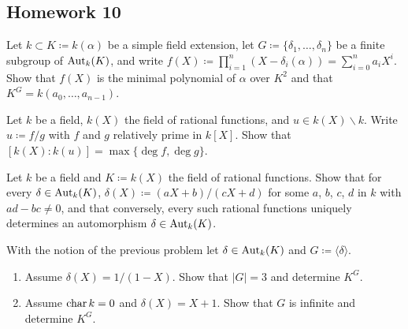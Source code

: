 \subsection{Homework 10}
\begin{problem}
  Let $k\subset K\coloneq k(\alpha)$ be a simple field extension, let
  $G\coloneq\{\delta_1,\dotsc,\delta_n\}$ be a finite subgroup of
  $\operatorname{Aut}_k(K)$, and write
  $f(X)\coloneq\prod_{i=1}^n(X-\delta_i(\alpha))=\sum_{i=0}^na_iX^i$. Show
  that $f(X)$ is the minimal polynomial of $\alpha$ over $K^2$ and that
  $K^G=k(a_0,\dotsc,a_{n-1})$.
\end{problem}
\begin{solution}
\end{solution}

\begin{problem}
  Let $k$ be a field, $k(X)$ the field of rational functions, and
  $u\in k(X)\smallsetminus k$. Write $u\coloneq f/g$ with $f$ and $g$
  relatively prime in $k[X]$. Show that
  $[k(X):k(u)]=\max\{\deg f,\deg g\}$.
\end{problem}
\begin{solution}
\end{solution}

\begin{problem}
  Let $k$ be a field and $K\coloneq k(X)$ the field of rational
  functions. Show that for every $\delta\in\operatorname{Aut}_k(K)$,
  $\delta(X)\coloneq (aX+b)/(cX+d)$ for some $a$, $b$, $c$, $d$ in $k$ with
  $ad-bc\neq 0$, and that conversely, every such rational functions
  uniquely determines an automorphism $\delta\in\operatorname{Aut}_k(K)$.
\end{problem}
\begin{solution}
\end{solution}

\begin{problem}
With the notion of the previous problem let $\delta\in\operatorname{Aut}_k(K)$ and
$G\coloneq\langle \delta \rangle$.
\begin{enumerate}[label=(\alph*),noitemsep]
\item Assume $\delta(X)=1/(1-X)$. Show that $|G|=3$ and determine $K^G$.
\item Assume $\operatorname{char} k=0$ and $\delta(X)=X+1$. Show that $G$ is infinite and
  determine $K^G$.
\end{enumerate}
\end{problem}
\begin{solution}
\end{solution}

